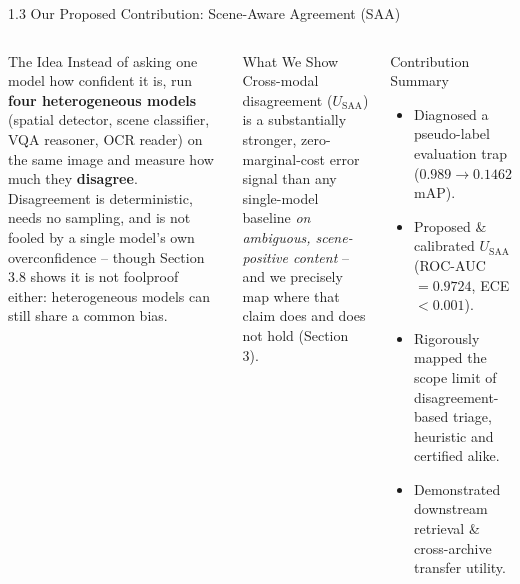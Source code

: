 \documentclass[aspectratio=169,11pt]{beamer}
\begin{document}
\begin{frame}{1.3 Our Proposed Contribution: Scene-Aware Agreement (SAA)}
\scriptsize
\begin{columns}[T]
\begin{block}{The Idea}
Instead of asking one model how confident it is, run \textbf{four heterogeneous models} (spatial detector, scene classifier, VQA reasoner, OCR reader) on the same image and measure how much they \textbf{disagree}. Disagreement is deterministic, needs no sampling, and is not fooled by a single model's own overconfidence -- though Section 3.8 shows it is not foolproof either: heterogeneous models can still share a common bias.
\end{block}
\begin{block}{What We Show}
Cross-modal disagreement ($U_{\text{SAA}}$) is a substantially stronger, zero-marginal-cost error signal than any single-model baseline \emph{on ambiguous, scene-positive content} -- and we precisely map where that claim does and does not hold (Section 3).
\end{block}
\begin{block}{Contribution Summary}
\begin{itemize}
  \item[1] Diagnosed a pseudo-label evaluation trap ($0.989\to0.1462$ mAP).
  \item[2] Proposed \& calibrated $U_{\text{SAA}}$ (ROC-AUC$=0.9724$, ECE$<0.001$).
  \item[3] Rigorously mapped the scope limit of disagreement-based triage, heuristic and certified alike.
  \item[4] Demonstrated downstream retrieval \& cross-archive transfer utility.
\end{itemize}
\end{block}
\end{columns}
\end{frame}
\end{document}
